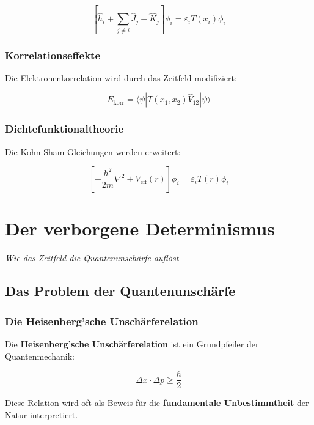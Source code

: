 \documentclass[12pt,a4paper]{report}
\begin{document}
	\begin{equation}
		\left[\hat{h}_i + \sum_{j\neq i}\hat{J}_j - \hat{K}_j\right]\phi_i = \varepsilon_i T(x_i)\phi_i
	\end{equation}
	
	\subsection{Korrelationseffekte}
	
	Die Elektronenkorrelation wird durch das Zeitfeld modifiziert:
	
	\begin{equation}
		E_{\text{korr}} = \langle\psi|T(x_1,x_2)\hat{V}_{12}|\psi\rangle
	\end{equation}
	
	\subsection{Dichtefunktionaltheorie}
	
	Die Kohn-Sham-Gleichungen werden erweitert:
	
	\begin{equation}
		\left[-\frac{\hbar^2}{2m}\nabla^2 + V_{\text{eff}}(r)\right]\phi_i = \varepsilon_i T(r)\phi_i
	\end{equation}
	
	\chapter{Der verborgene Determinismus}
	\textit{Wie das Zeitfeld die Quantenunschärfe auflöst}
	
	\section{Das Problem der Quantenunschärfe}
	
	\subsection{Die Heisenberg'sche Unschärferelation}
	
	Die \textbf{Heisenberg'sche Unschärferelation} ist ein Grundpfeiler der Quantenmechanik:
	
	\begin{equation}
		\Delta x \cdot \Delta p \geq \frac{\hbar}{2}
	\end{equation}
	
	Diese Relation wird oft als Beweis für die \textbf{fundamentale Unbestimmtheit} der Natur interpretiert.
	
\end{document}
